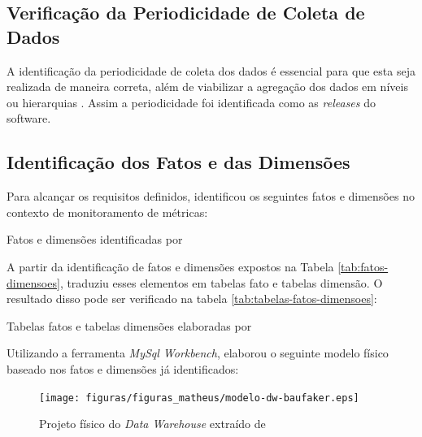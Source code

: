 \subsection{Verificação da Periodicidade de Coleta de Dados}

A identificação da periodicidade de coleta dos dados é essencial para que esta seja
realizada de maneira correta, além de viabilizar a agregação dos dados em níveis ou
hierarquias \cite{rego_monitoramento_2014}. Assim a periodicidade foi identificada como as \textit{releases} do software.

\subsection{Identificação dos Fatos e das Dimensões}
	
Para alcançar os requisitos definidos,  identificou os seguintes fatos e dimensões no contexto de monitoramento de métricas:

\begin{table}[!ht]
	\begin{center}
	
	 
	\caption{Fatos e dimensões identificadas por }
	\label{tab:fatos-dimensoes}
	\end{center}
	\end{table}	
	\FloatBarrier


A partir da identificação de fatos e dimensões expostos na Tabela \ref{tab:fatos-dimensoes},   traduziu esses elementos em tabelas fato e tabelas dimensão. O resultado disso pode ser verificado na tabela \ref{tab:tabelas-fatos-dimensoes}:

\begin{table}[!ht]
	\begin{center}
	
	 
	\caption{Tabelas fatos e tabelas dimensões elaboradas por }
	\label{tab:tabelas-fatos-dimensoes}
	\end{center}
	\end{table}	
	\FloatBarrier


Utilizando a ferramenta \textit{MySql Workbench},  elaborou o seguinte modelo físico baseado nos fatos e dimensões já identificados:

\begin{figure}[h!]
\centering
\texttt{[image: figuras/figuras\_matheus/modelo-dw-baufaker.eps]}
\caption{Projeto físico do \textit{Data Warehouse} extraído de }
\label{fig:arquitetura_solucao_baufaker}
\end{figure}
\FloatBarrier

